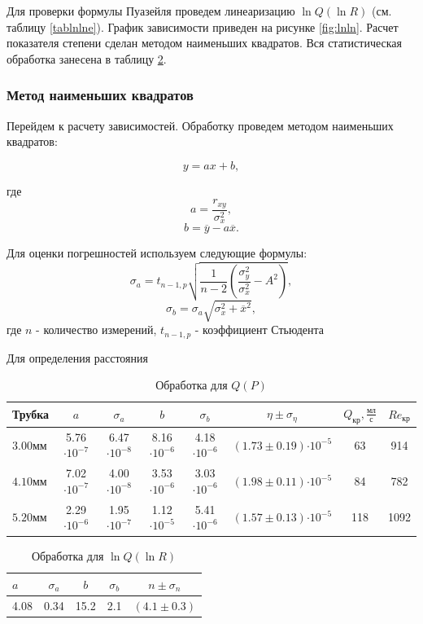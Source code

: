 \documentclass[12pt,a4paper]{article}
\newcommand{\e}[1]{\text{$\cdot10^{#1}$}}
\newcommand{\uf}[2]{\text{$\frac{\text{#1}}{\text{#2}}$}}
\begin{document}
Для проверки формулы Пуазейля проведем линеаризацию $\ln{Q} (\ln{R})$ (см. таблицу \ref{tablnlne}). График зависимости приведен на рисунке \ref{fig:lnln}. Расчет показателя степени сделан методом наименьших квадратов. Вся статистическая обработка занесена в таблицу \ref{tablll}.

\subsubsection*{Метод наименьших квадратов}
Перейдем к расчету зависимостей. Обработку проведем методом наименьших квадратов:

$$y = ax + b,$$

где $$a = \frac{r_{xy}}{ \sigma_x^2},$$
$$b = \overline{y} - a\overline{x}.$$

Для оценки погрешностей используем следующие формулы:
$$\sigma_a =  t_{n-1, p} \sqrt{\frac{1}{n-2} \left( \frac{\sigma_y^2}{\sigma_x^2} - A^2 \right)},$$
$$\sigma_b = \sigma_a \sqrt{\sigma_x^2 + \overline{x}^2},$$
где 
$n$ - количество измерений, $ t_{n-1, p}$ - коэффициент Стьюдента

Для определения расстояния
\begin{table}[H]
	
	\caption{Обработка для $Q(P)$}
	\label{tab:ab}
	\centering
	\footnotesize
	\begin{tabular}{lccccccc}
		\toprule
		
		Трубка & $a$ & $\sigma_a$ & $b$ & $\sigma_b$ & $\eta \pm \sigma_{\eta}$ & $Q_{\text{кр}}, \uf{мл}{с}$ & $Re_{\text{кр}}$\\
		\midrule
		$3.00 мм$ & 5.76 $\cdot 10^{-7}$ & 6.47 $\cdot 10^{-8}$ &  8.16 $\cdot 10^{-6}$ & 4.18 $\cdot 10^{-6}$ & $(1.73\pm0.19)\e{-5}$ & 63 & 914\\ 
		$4.10 мм$ & 7.02 $\cdot 10^{-7}$ & 4.00 $\cdot 10^{-8}$ &  3.53 $\cdot 10^{-6}$ & 3.03 $\cdot 10^{-6}$ & $(1.98\pm0.11)\e{-5}$ & 84 & 782\\ 
		$5.20 мм$ & 2.29 $\cdot 10^{-6}$ & 1.95 $\cdot 10^{-7}$ &  1.12 $\cdot 10^{-5}$ & 5.41 $\cdot 10^{-6}$ & $(1.57\pm0.13)\e{-5}$ & 118 & 1092\\  
		\bottomrule
	\end{tabular}
\end{table}

\begin{table}[H]
	
	\caption{Обработка для  $\ln{Q} (\ln{R})$}
	\label{tablll}
	\centering
	\footnotesize
	\begin{tabular}{lcccc}
		\toprule
		$a$ & $\sigma_a$ & $b$ & $\sigma_b$ & $n\pm\sigma_n$\\
		\midrule
		4.08  &  0.34 & 15.2  &  2.1 & $(4.1\pm 0.3)$ \\
		\bottomrule
	\end{tabular}
\end{table}
\end{document}
